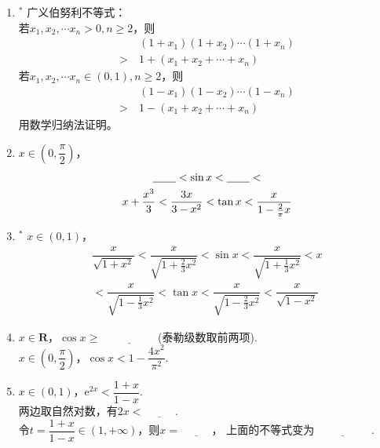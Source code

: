 \documentclass{article}
\newif\ifte
\newcommand{\e}{\mathrm{e}}
\renewcommand\geq\geqslant
\begin{document}
\begin{multicols}{2}
\begin{enumerate}[leftmargin=20pt]
\item $^*$ 广义伯努利不等式：\\
若$ x_1,x_2,\cdots x_n >0, n\geq 2 $，则
\begin{align*}
     &\ (1+x_1)(1+x_2)\cdots (1+x_n)\\
    >&\ 1+(x_1+x_2+\cdots +x_n) 
\end{align*}
若$ x_1,x_2,\cdots x_n \in (0,1), n\geq 2 $，则
\begin{align*}
     &\ (1-x_1)(1-x_2)\cdots (1-x_n)\\
    >&\ 1-(x_1+x_2+\cdots +x_n) 
\end{align*}
用数学归纳法证明。

\item $ x\in \left( 0,\dfrac{\pi}{2}\right) $，
\begin{gather*}
    \underline{\ \ifte \dfrac{2}{\pi}x\else \hspace{0.5cm} \fi\ }
    <\sin x < \underline{\ \ifte x\else \hspace{0.5cm} \fi\ } <
    \\ x+\dfrac{x^3}{3} 
    <\dfrac{3x}{3-x^2}<\tan x <\dfrac{x}{1-\frac{2}{\pi}x}
\end{gather*} 

\item $^*$ $ x\in (0,1) $，
\begin{gather*}
    \dfrac{x}{\sqrt{1+x^2}}<\dfrac{x}{\sqrt{1+\frac{2}{3}x^2}}<
    \sin x<\dfrac{x}{\sqrt{1+\frac{1}{3}x^2}}<x \\
     <\dfrac{x}{\sqrt{1-\frac{1}{3}x^2}}<
    \tan x<\dfrac{x}{\sqrt{1-\frac{2}{3}x^2}}<
    \dfrac{x}{\sqrt{1-x^2}}
\end{gather*} 

\item $ x\in \textbf{R} $，$ \cos x\geq \underline{\ 
    \ifte 1-\dfrac{1}{2}x^2 \else \hspace{2cm} \fi\ } $(泰勒级数取前两项). \\
$ x\in \left(0,\dfrac{\pi}{2}\right) $，$ \cos x <1-\dfrac{4x^2}{\pi^2} $. 

\item $ x\in (0,1) $，$ \e^{2x}<\dfrac{1+x}{1-x} $. \\
两边取自然对数，有$ 2x<\underline{\ \ifte 
    \ln\dfrac{1+x}{1-x} \else \hspace{1cm} \fi\ } $. \\
令$ t=\dfrac{1+x}{1-x}\in(1,+\infty) $，则$ x=\underline{\ \ifte 
    \dfrac{t-1}{t+1}\else \hspace{1cm} \fi\ } $，
上面的不等式变为$ \underline{\ \ifte \dfrac{2(t-1)}{t+1}<\ln t
    \else \hspace{2cm} \fi\ } $.


\end{enumerate}
\end{multicols}
\end{document}
